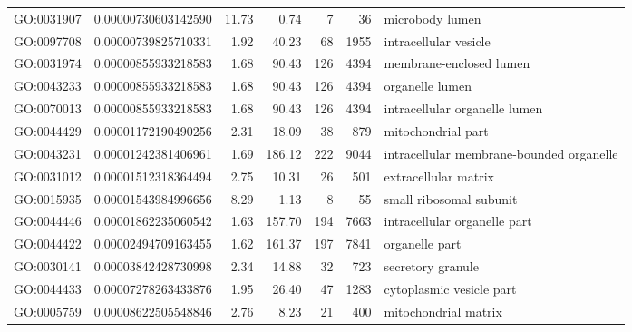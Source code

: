 \documentclass[letterpaper,12pt]{article}
\numberwithin{equation}{appendix}
\begin{document}
\begin{landscape}
{{\begin{longtable}{lrrrrrl}
  GO:0031907 & 0.00000730603142590 & 11.73 & 0.74 & 7 & 36 & microbody lumen \\ 
  GO:0097708 & 0.00000739825710331 & 1.92 & 40.23 & 68 & 1955 & intracellular vesicle \\ 
  GO:0031974 & 0.00000855933218583 & 1.68 & 90.43 & 126 & 4394 & membrane-enclosed lumen \\ 
  GO:0043233 & 0.00000855933218583 & 1.68 & 90.43 & 126 & 4394 & organelle lumen \\ 
  GO:0070013 & 0.00000855933218583 & 1.68 & 90.43 & 126 & 4394 & intracellular organelle lumen \\ 
  GO:0044429 & 0.00001172190490256 & 2.31 & 18.09 & 38 & 879 & mitochondrial part \\ 
  GO:0043231 & 0.00001242381406961 & 1.69 & 186.12 & 222 & 9044 & intracellular membrane-bounded organelle \\ 
  GO:0031012 & 0.00001512318364494 & 2.75 & 10.31 & 26 & 501 & extracellular matrix \\ 
  GO:0015935 & 0.00001543984996656 & 8.29 & 1.13 & 8 & 55 & small ribosomal subunit \\ 
  GO:0044446 & 0.00001862235060542 & 1.63 & 157.70 & 194 & 7663 & intracellular organelle part \\ 
  GO:0044422 & 0.00002494709163455 & 1.62 & 161.37 & 197 & 7841 & organelle part \\ 
  GO:0030141 & 0.00003842428730998 & 2.34 & 14.88 & 32 & 723 & secretory granule \\ 
  GO:0044433 & 0.00007278263433876 & 1.95 & 26.40 & 47 & 1283 & cytoplasmic vesicle part \\ 
  GO:0005759 & 0.00008622505548846 & 2.76 & 8.23 & 21 & 400 & mitochondrial matrix \\ 
   \bottomrule
\end{longtable}
}}
\end{landscape}
\end{document}
